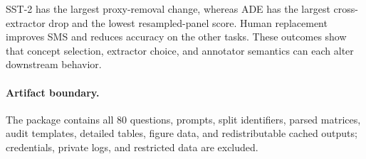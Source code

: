 SST-2 has the largest proxy-removal change, whereas ADE has the largest cross-extractor drop and the lowest resampled-panel score. Human replacement improves SMS and reduces accuracy on the other tasks. These outcomes show that concept selection, extractor choice, and annotator semantics can each alter downstream behavior.

\paragraph{Artifact boundary.}
The package contains all 80 questions, prompts, split identifiers, parsed matrices, audit templates, detailed tables, figure data, and redistributable cached outputs; credentials, private logs, and restricted data are excluded.
